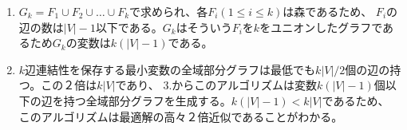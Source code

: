 \documentclass{report}
\begin{document}
\begin{CJK}{UTF8}{min}
\begin{enumerate}
        \item $G_k=F_1\cup F_2 \cup \dots \cup F_k$で求められ、各$F_i (1\leq i \leq k)$は森であるため、
        $F_i$の辺の数は$|V|-1$以下である。$G_k$はそういう$F_i$を$k$をユニオンしたグラフであるため$G_k$の変数は$k(|V|-1)$である。
        \item $k$辺連結性を保存する最小変数の全域部分グラフは最低でも$k|V|/2$個の辺の持つ。この２倍は$k|V|$であり、
        3.からこのアルゴリズムは変数$k(|V|-1)$個以下の辺を持つ全域部分グラフを生成する。$k(|V|-1)<k|V|$であるため、
        このアルゴリズムは最適解の高々２倍近似であることがわかる。
    \end{enumerate}
\end{CJK}
\end{document}
